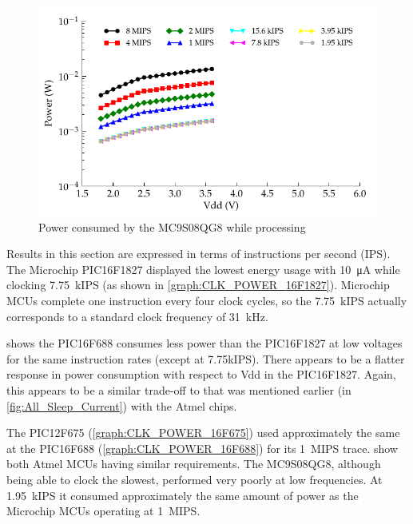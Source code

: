       \begin{figure}
        \centering
        \includegraphics{content/pt1/03-EnergyRequirements/graphics/Graph_MC9S08QG8_Clock_Power}
        \caption{\label{graph:CLK_POWER_MC9S08QG8}Power consumed by the MC9S08QG8 while processing}
      \end{figure}

      Results in this section are expressed in terms of instructions per second (IPS).
      The Microchip PIC16F1827 displayed the lowest energy usage with \SI{10}{\micro\ampere} while clocking \SI{7.75}{\kilo IPS} (as shown in \cref{graph:CLK_POWER_16F1827}).
      Microchip MCUs complete one instruction every four clock cycles, so the \SI{7.75}{\kilo IPS} actually corresponds to a standard clock frequency of \SI{31}{\kilo\hertz}.

       shows the PIC16F688 consumes less power than the PIC16F1827 at low voltages for the same instruction rates (except at 7.75kIPS).
      There appears to be a flatter response in power consumption with respect to Vdd in the PIC16F1827.
      Again, this appears to be a similar trade-off to that was mentioned earlier (in \cref{fig:All_Sleep_Current}) with the Atmel chips.

      The PIC12F675 (\cref{graph:CLK_POWER_16F675}) used approximately the same at the PIC16F688 (\cref{graph:CLK_POWER_16F688}) for its \SI{1}{\mega IPS} trace.
       show both Atmel MCUs having similar requirements.
      The MC9S08QG8, although being able to clock the slowest, performed very poorly at low frequencies.
      At \SI{1.95}{\kilo IPS} it consumed approximately the same amount of power as the Microchip MCUs operating at \SI{1}{\mega IPS}.

